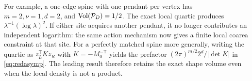 For example, a one-edge spine with one pendant per vertex has \(m=2,\nu=1,d=2\), and \(\operatorname{Vol}({\cal P}_D)=1/2\). The exact local quartic produces \(\lambda^{-1}(\log\lambda)^2\). If either site acquires another pendant, it no longer contributes an independent logarithm: the same action mechanism now gives a finite local coarea constraint at that site. For a perfectly matched spine more generally, writing the quartic as \(z_L^{\mathsf T}Kz_R\) with \(K=-M_0^{-{\mathsf T}}\) yields the prefactor \((2\pi)^{m/2}2^d/|\det K|\) in \eqref{eq:redasymp}. The leading result therefore retains the exact shape volume even when the local density is not a product.
